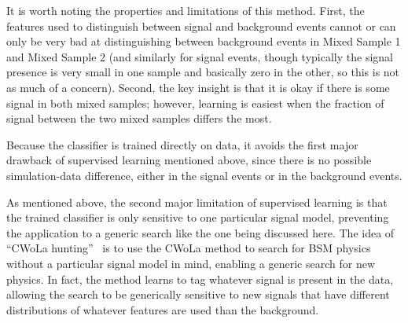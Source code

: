 It is worth noting the properties and limitations of this method.
First, the features used to distinguish between signal and background events cannot or can only be very bad at distinguishing between background events in Mixed Sample 1 and Mixed Sample 2 (and similarly for signal events, though typically the signal presence is very small in one sample and basically zero in the other, so this is not as much of a concern).
Second, the key insight is that it is okay if there is some signal in both mixed samples; however, learning is easiest when the fraction of signal between the two mixed samples differs the most.

Because the classifier is trained directly on data, it avoids the first major drawback of supervised learning mentioned above, since there is no possible simulation-data difference, either in the signal events or in the background events.

As mentioned above, the second major limitation of supervised learning is that the trained classifier is only sensitive to one particular signal model, preventing the application to a generic search like the one being discussed here.
The idea of ``CWoLa hunting''~\cite{Collins:2018epr,Collins:2019jip} is to use the CWoLa method to search for BSM physics without a particular signal model in mind, enabling a generic search for new physics.
In fact, the method learns to tag whatever signal is present in the data, allowing the search to be generically sensitive to new signals that have different distributions of whatever features are used than the background.


